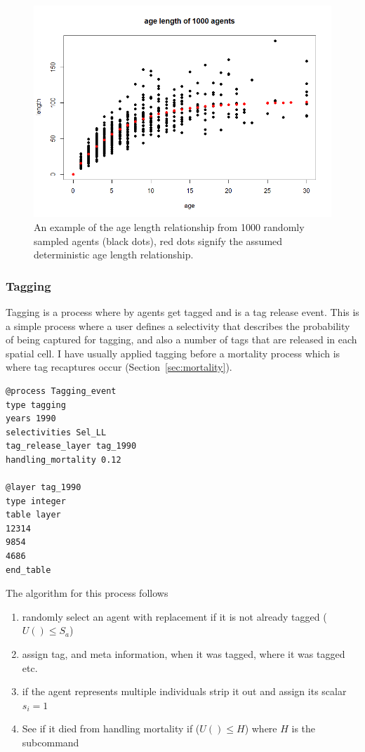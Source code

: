 \begin{figure}[h!]\label{fig:age_length}
	\centering
	\includegraphics[scale=0.6]{Figures/age-length.png}%
	\caption{An example of the age length relationship from 1000 randomly sampled agents (black dots), red dots signify the assumed deterministic age length relationship.}
\end{figure}
\subsubsection{Tagging}
Tagging is a process where by agents get tagged and is a tag release event. This is a simple process where a user defines a selectivity that describes the probability of being captured for tagging, and also a number of tags that are released in each spatial cell. I have usually applied tagging before a mortality process which is where tag recaptures occur (Section~\ref{sec:mortality}).

{\small{\begin{verbatim}
@process Tagging_event
type tagging
years 1990
selectivities Sel_LL
tag_release_layer tag_1990
handling_mortality 0.12

@layer tag_1990
type integer
table layer
12314
9854
4686
end_table
\end{verbatim}}}

The algorithm for this process follows
\begin{enumerate}
	\item randomly select an agent with replacement if it is not already tagged ($U() \leq S_a$)
	\item assign tag, and meta information, when it was tagged, where it was tagged etc.
	\item if the agent represents multiple individuals strip it out and assign its scalar $s_i = 1$
	\item See if it died from handling mortality if ($U() \leq H$) where $H$ is the subcommand 
\end{enumerate}

